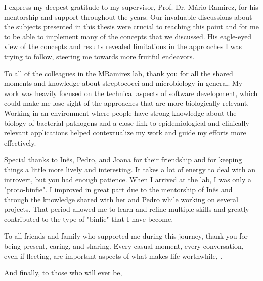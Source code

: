 


I express my deepest gratitude to my supervisor, Prof. Dr. Mário Ramirez, for his mentorship and support throughout the years. Our invaluable discussions about the subjects presented in this thesis were crucial to reaching this point and for me to be able to implement many of the concepts that we discussed. His eagle-eyed view of the concepts and results revealed limitations in the approaches I was trying to follow, steering me towards more fruitful endeavors.

To all of the colleagues in the MRamirez lab, thank you for all the shared moments and knowledge about streptococci and microbiology in general. My work was heavily focused on the technical aspects of software development, which could make me lose sight of the approaches that are more biologically relevant. Working in an environment where people have strong knowledge about the biology of bacterial pathogens and a close link to epidemiological and clinically relevant applications helped contextualize my work and guide my efforts more effectively.

Special thanks to Inês, Pedro, and Joana for their friendship and for keeping things a little more lively and interesting. It takes a lot of energy to deal with an introvert, but you had enough patience. When I arrived at the lab, I was only a "proto-binfie". I improved in great part due to the mentorship of Inês and through the knowledge shared with her and Pedro while working on several projects. That period allowed me to learn and refine multiple skills and greatly contributed to the type of "binfie" that I have become.

To all friends and family who supported me during this journey, thank you for being present, caring, and sharing. Every casual moment, every conversation, even if fleeting, are important aspects of what makes life worthwhile, .




And finally, to those who will ever be,

